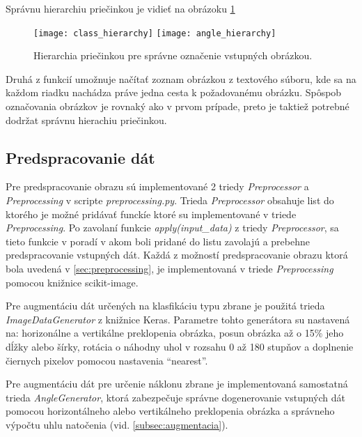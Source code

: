 Správnu hierarchiu priečinkou je vidieť na obrázoku \ref{pic:folderhierarchy}

\begin{figure}[H]
    \centering
    \texttt{[image: class\_hierarchy]}
    \qquad
    \texttt{[image: angle\_hierarchy]}
    \caption{Hierarchia priečinkou pre správne označenie vstupných obrázkou.}
    \label{pic:folderhierarchy}
\end{figure}

Druhá z funkcií umožnuje načítať zoznam obrázkou z textového súboru, kde sa na každom riadku nachádza práve jedna cesta k požadovanému obrázku.
Spôspob označovania obrázkov je rovnaký ako v prvom prípade, preto je taktiež potrebné dodržat správnu hierachiu priečinkou.

\subsection{Predspracovanie dát}
\label{subsec:predspracovaniedat}
Pre predspracovanie obrazu sú implementované 2 triedy \textit{Preprocessor} a \textit{Preprocessing} v scripte \textit{preprocessing.py}.
Trieda \textit{Preprocessor} obsahuje list do ktorého je možné pridávať funckíe ktoré su implementované v triede \textit{Preprocessing}.
Po zavolaní funkcie \textit{apply(input\_data)} z triedy \textit{Preprocessor}, sa tieto
    funkcie v poradí v akom boli pridané do listu zavolajú a prebehne predspracovanie vstupných dát.
Každá z možností predspracovanie obrazu ktorá bola uvedená v \ref{sec:preprocessing}, je implementovaná v triede \textit{Preprocessing} pomocou
    knižnice scikit-image.

Pre augmentáciu dát určených na klasfikáciu typu zbrane je použitá trieda \textit{ImageDataGenerator} z knižnice Keras.
Parametre tohto generátora su nastavená na: horizonálne a vertikálne preklopenia obrázka, posun obrázka až o 15\% jeho dĺžky alebo šírky,
    rotácia o náhodny uhol v rozsahu 0 až 180 stupňov a doplnenie čiernych pixelov pomocou nastavenia ``nearest''.

Pre augmentáciu dát pre určenie náklonu zbrane je implementovaná samostatná trieda \textit{AngleGenerator}, ktorá zabezpečuje správne dogenerovanie
    vstupných dát pomocou horizontálneho alebo vertikálneho preklopenia obrázka a správneho výpočtu uhlu natočenia (vid. \ref{subsec:augmentacia}).
